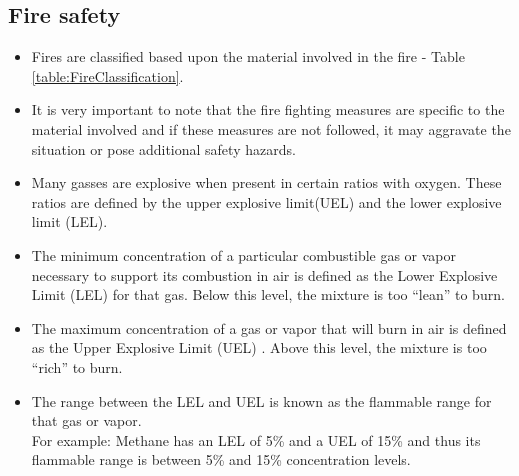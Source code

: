 \subsection{Fire safety}
\begin{itemize}
\item Fires are classified based upon the material involved in the fire - Table \ref{table:FireClassification}.  
\item It is very important to note that the fire fighting measures are specific to the material involved and if these measures are not followed, it may aggravate the situation or pose additional safety hazards.
\item Many gasses are explosive when present in certain ratios with oxygen. These ratios are defined by the upper explosive limit(UEL) and the lower explosive limit (LEL). 
\item The minimum concentration of a particular combustible gas or vapor necessary to support its combustion in air is defined as the Lower Explosive Limit (LEL)  for that gas. Below this level, the mixture is too “lean” to burn. 
\item The maximum concentration of a gas or vapor that will burn in air is defined as the Upper Explosive Limit (UEL) . Above this level, the mixture is too “rich” to burn.
\item The range between the LEL and UEL is known as the flammable range for that gas or vapor.\\
For example: Methane has an LEL of 5\% and a UEL of 15\% and thus its flammable range is between 5\% and 15\% concentration levels.
\end{itemize}
